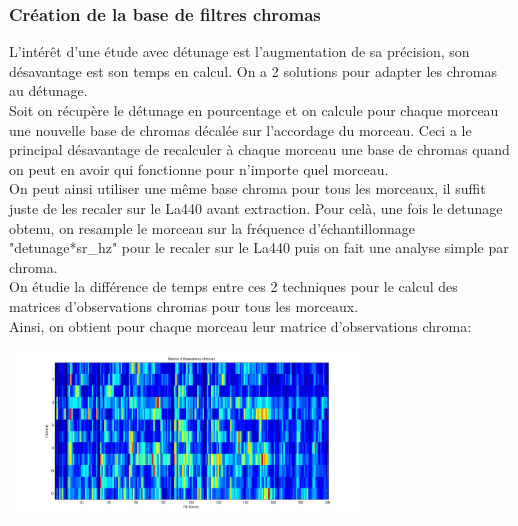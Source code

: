 \documentclass[12pt,a4paper]{article}
\begin{document}
\subsubsection{Création de la base de filtres chromas}
L'intérêt d'une étude avec détunage est l'augmentation de sa précision, son désavantage est son temps en calcul. On a 2 solutions pour adapter les chromas au détunage.
\\Soit on récupère le détunage en pourcentage et on calcule pour chaque morceau une nouvelle base de chromas décalée sur l'accordage du morceau. Ceci a le principal désavantage de recalculer à chaque morceau une base de chromas quand on peut en avoir qui fonctionne pour n'importe quel morceau.
\\On peut ainsi utiliser une même base chroma pour tous les morceaux, il suffit juste de les recaler sur le La440 avant extraction. Pour celà, une fois le detunage obtenu, on resample le morceau sur la fréquence d'échantillonnage "detunage*sr_hz" pour le recaler sur le La440 puis on fait une analyse simple par chroma.
\\On étudie la différence de temps entre ces 2 techniques pour le calcul des matrices d'observations chromas pour tous les morceaux.
\\Ainsi, on obtient pour chaque morceau leur matrice d'observations chroma:

\begin{center}
\includegraphics[width=0.7\textwidth]{obs_chroma_morceau.jpg}
\end{center}
\end{document}

